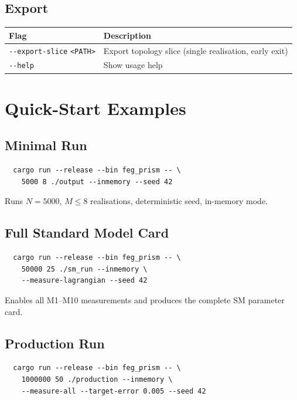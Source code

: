 \documentclass[11pt, a4paper, openany]{book}
\newcommand{\code}[1]{\texttt{#1}}
\newcommand{\flag}[1]{\texttt{-{}-#1}}
\begin{document}
\subsection{Export}

\begin{longtable}{lp{10cm}}
  \toprule
  \textbf{Flag} & \textbf{Description} \\
  \midrule
  \flag{export-slice} \code{<PATH>} & Export topology slice (single realisation, early exit) \\
  \flag{help}                        & Show usage help \\
  \bottomrule
\end{longtable}

\section{Quick-Start Examples}

\subsection{Minimal Run}

\begin{verbatim}
  cargo run --release --bin feg_prism -- \
    5000 8 ./output --inmemory --seed 42
\end{verbatim}

Runs $N = 5000$, $M \leq 8$ realisations, deterministic seed, in-memory mode.

\subsection{Full Standard Model Card}

\begin{verbatim}
  cargo run --release --bin feg_prism -- \
    50000 25 ./sm_run --inmemory \
    --measure-lagrangian --seed 42
\end{verbatim}

Enables all M1--M10 measurements and produces the complete SM parameter card.

\subsection{Production Run}

\begin{verbatim}
  cargo run --release --bin feg_prism -- \
    1000000 50 ./production --inmemory \
    --measure-all --target-error 0.005 --seed 42
\end{verbatim}
\end{document}

